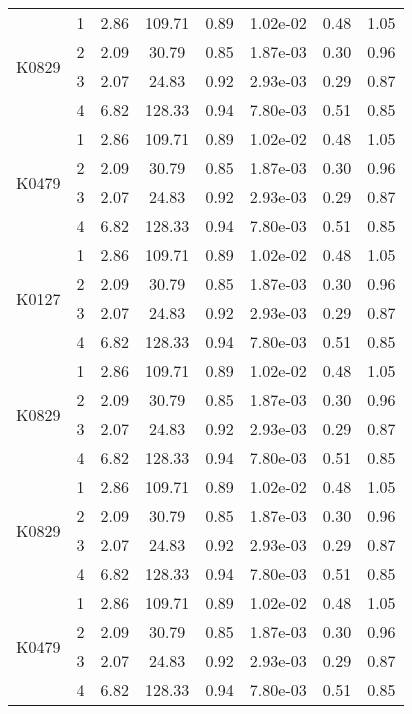 \begin{longtable}{|c|c|c|c|c|c|c|c|}
\multirow{4}{*}{K0829} & 1 & 2.86 & 109.71 & 0.89 & 1.02e-02 & 0.48 & 1.05 \\
& 2 & 2.09 & 30.79 & 0.85 & 1.87e-03 & 0.30 & 0.96 \\
& 3 & 2.07 & 24.83 & 0.92 & 2.93e-03 & 0.29 & 0.87 \\
& 4 & 6.82 & 128.33 & 0.94& 7.80e-03 & 0.51 & 0.85 \\ \hline

\multirow{4}{*}{K0479} & 1 & 2.86 & 109.71 & 0.89 & 1.02e-02 & 0.48 & 1.05 \\
& 2 & 2.09 & 30.79 & 0.85 & 1.87e-03 & 0.30 & 0.96 \\
& 3 & 2.07 & 24.83 & 0.92 & 2.93e-03 & 0.29 & 0.87 \\
& 4 & 6.82 & 128.33 & 0.94& 7.80e-03 & 0.51 & 0.85 \\ \hline


\multirow{4}{*}{K0127} & 1 & 2.86 & 109.71 & 0.89 & 1.02e-02 & 0.48 & 1.05 \\
& 2 & 2.09 & 30.79 & 0.85 & 1.87e-03 & 0.30 & 0.96 \\
& 3 & 2.07 & 24.83 & 0.92 & 2.93e-03 & 0.29 & 0.87 \\
& 4 & 6.82 & 128.33 & 0.94 & 7.80e-03 & 0.51 & 0.85 \\ \hline

\multirow{4}{*}{K0829} & 1 & 2.86 & 109.71 & 0.89 & 1.02e-02 & 0.48 & 1.05 \\
& 2 & 2.09 & 30.79 & 0.85 & 1.87e-03 & 0.30 & 0.96 \\
& 3 & 2.07 & 24.83 & 0.92 & 2.93e-03 & 0.29 & 0.87 \\
& 4 & 6.82 & 128.33 & 0.94 & 7.80e-03 & 0.51 & 0.85 \\ \hline

\multirow{4}{*}{K0829} & 1 & 2.86 & 109.71 & 0.89 & 1.02e-02 & 0.48 & 1.05 \\
& 2 & 2.09 & 30.79 & 0.85 & 1.87e-03 & 0.30 & 0.96 \\
& 3 & 2.07 & 24.83 & 0.92 & 2.93e-03 & 0.29 & 0.87 \\
& 4 & 6.82 & 128.33 & 0.94& 7.80e-03 & 0.51 & 0.85 \\ \hline

\multirow{4}{*}{K0479} & 1 & 2.86 & 109.71 & 0.89 & 1.02e-02 & 0.48 & 1.05 \\
& 2 & 2.09 & 30.79 & 0.85 & 1.87e-03 & 0.30 & 0.96 \\
& 3 & 2.07 & 24.83 & 0.92 & 2.93e-03 & 0.29 & 0.87 \\
& 4 & 6.82 & 128.33 & 0.94& 7.80e-03 & 0.51 & 0.85 \\ \hline


\end{longtable}

